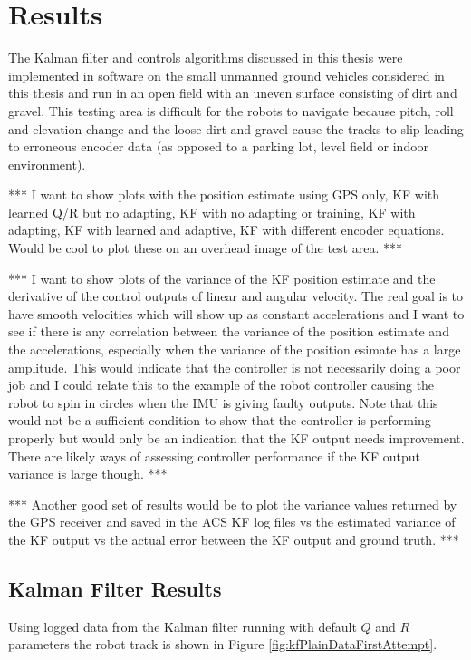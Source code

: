 \chapter{Results}
\label{ch:results}
The Kalman filter and controls algorithms discussed in this thesis were implemented in software on the small unmanned ground vehicles considered in this thesis and run in an open field with an uneven surface consisting of dirt and gravel. This testing area is difficult for the robots to navigate because pitch, roll and elevation change and the loose dirt and gravel cause the tracks to slip leading to erroneous encoder data (as opposed to a parking lot, level field or indoor environment).

*** I want to show plots with the position estimate using GPS only, KF with learned Q/R but no adapting, KF with no adapting or training, KF with adapting, KF with learned and adaptive, KF with different encoder equations. Would be cool to plot these on an overhead image of the test area. ***

*** I want to show plots of the variance of the KF position estimate and the derivative of the control outputs of linear and angular velocity. The real goal is to have smooth velocities which will show up as constant accelerations and I want to see if there is any correlation between the variance of the position estimate and the accelerations, especially when the variance of the position esimate has a large amplitude. This would indicate that the controller is not necessarily doing a poor job and I could relate this to the example of the robot controller causing the robot to spin in circles when the IMU is giving faulty outputs. Note that this would not be a sufficient condition to show that the controller is performing properly but would only be an indication that the KF output needs improvement. There are likely ways of assessing controller performance if the KF output variance is large though. ***

*** Another good set of results would be to plot the variance values returned by the GPS receiver and saved in the ACS KF log files vs the estimated variance of the KF output vs the actual error between the KF output and ground truth. ***

\section{Kalman Filter Results}
\label{sec:kfResults}
Using logged data from the Kalman filter running with default $Q$ and $R$ parameters the robot track is shown in Figure \ref{fig:kfPlainDataFirstAttempt}.

